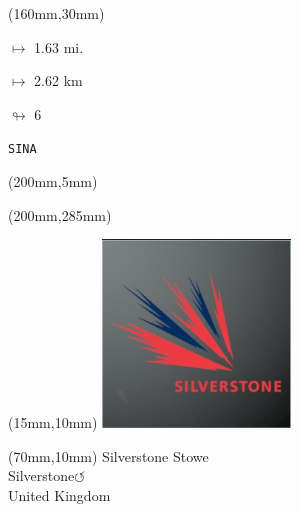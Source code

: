 \begin{textblock*}{40mm}(160mm,30mm)%
\Large
\par$\mapsto$ 1.63 mi.
\par$\mapsto$ 2.62 km
\par$\looparrowright$ 6
\par\hfill\tiny\tt SINA\\
\end{textblock*}
\begin{textblock*}{20mm}(200mm,5mm)%
\fbox{\thepage}
\label{SINA}
\end{textblock*}
\begin{textblock*}{20mm}(200mm,285mm)%
\fbox{\thepage}
\end{textblock*}

\null\newpage
\begin{textblock*}{50mm}(15mm,10mm)%
\includegraphics[width=50mm]{LG/2015-05-20_00094.png}
\end{textblock*}
\begin{textblock*}{130mm}(70mm,10mm)%
{\fontsize{20}{20}\selectfont Silverstone Stowe\\}
{\fontsize{16}{16}\selectfont Silverstone\hfill \huge$\circlearrowleft$\\}
{\fontsize{12}{12}\selectfont United Kingdom\\}
\end{textblock*}
